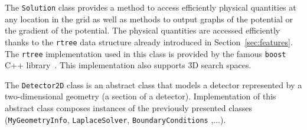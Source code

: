 \documentclass[11pt]{article}
\begin{document}
		The \texttt{Solution} class provides a method to access efficiently physical
		quantities at any location in the grid as well as methods to output graphs
		of the potential or the gradient of the potential. The physical quantities
		are accessed efficiently thanks to the \texttt{rtree} data structure already
		introduced in Section~\ref{sec:features}. The \texttt{rtree} implementation
		used in this class is provided by the famous \texttt{boost} C++ library~\cite{boost.rtree}.
		This implementation also supports 3D search spaces.

		The \texttt{Detector2D} class is an abstract class that models a detector
		represented by a two-dimensional geometry (a section of a detector). Implementation
		of this abstract class composes instances of the previously presented classes
		(\texttt{MyGeometryInfo}, \texttt{LaplaceSolver}, \texttt{BoundaryConditions}
		,...).
\end{document}
